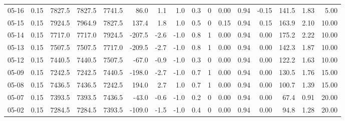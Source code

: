 \begin{threeparttable}
{\begin{tabular}{lrrrrrrrrrrrrrrr}
  05-16 &     0.15 & 7827.5 & 7827.5 & 7741.5 &       86.0 &            1.1 &                      1.0 &                 0.3 &              0 &       0.00 &      0.94 &          -0.15 &            141.5 &            1.83 &                   5.00 \\
  05-15 &     0.15 & 7924.5 & 7964.9 & 7827.5 &      137.4 &            1.8 &                      1.0 &                 0.5 &              0 &       0.15 &      0.94 &           0.15 &            163.9 &            2.10 &                  10.00 \\
  05-14 &     0.15 & 7717.0 & 7717.0 & 7924.5 &     -207.5 &           -2.6 &                     -1.0 &                 0.8 &              1 &       0.00 &      0.94 &           0.00 &            175.2 &            2.22 &                  10.00 \\
  05-13 &     0.15 & 7507.5 & 7507.5 & 7717.0 &     -209.5 &           -2.7 &                     -1.0 &                 0.8 &              1 &       0.00 &      0.94 &           0.00 &            142.3 &            1.87 &                  10.00 \\
  05-12 &     0.15 & 7440.5 & 7440.5 & 7507.5 &      -67.0 &           -0.9 &                     -1.0 &                 0.3 &              0 &       0.00 &      0.94 &           0.00 &            122.2 &            1.63 &                  10.00 \\
  05-09 &     0.15 & 7242.5 & 7242.5 & 7440.5 &     -198.0 &           -2.7 &                     -1.0 &                 0.7 &              1 &       0.00 &      0.94 &           0.00 &            130.5 &            1.76 &                  15.00 \\
  05-08 &     0.15 & 7436.5 & 7436.5 & 7242.5 &      194.0 &            2.7 &                      1.0 &                 0.7 &              1 &       0.00 &      0.94 &           0.00 &            100.7 &            1.39 &                  15.00 \\
  05-07 &     0.15 & 7393.5 & 7393.5 & 7436.5 &      -43.0 &           -0.6 &                     -1.0 &                 0.2 &              0 &       0.00 &      0.94 &           0.00 &             67.4 &            0.91 &                  20.00 \\
  05-02 &     0.15 & 7284.5 & 7284.5 & 7393.5 &     -109.0 &           -1.5 &                     -1.0 &                 0.4 &              0 &       0.00 &      0.94 &           0.00 &             94.8 &            1.28 &                  20.00 \\

\end{tabular}}
\end{threeparttable}
